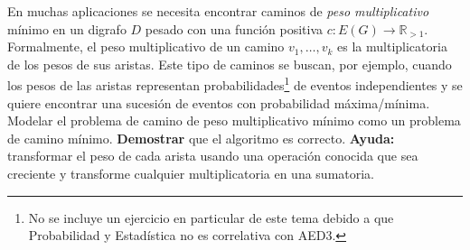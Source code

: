 

  \item En muchas aplicaciones se necesita encontrar caminos de \emph{peso multiplicativo} mínimo en un digrafo $D$ pesado con una función positiva $c \colon E(G) \to \mathbb{R}_{> 1}$.  Formalmente, el peso multiplicativo de un camino $v_1, \ldots, v_k$ es la multiplicatoria de los pesos de sus aristas.  Este tipo de caminos se buscan, por ejemplo, cuando los pesos de las aristas representan probabilidades\footnote{No se incluye un ejercicio en particular de este tema debido a que Probabilidad y Estadística no es correlativa con AED3.} de eventos independientes y se quiere encontrar una sucesión de eventos con probabilidad máxima/mínima.  Modelar el problema de camino de peso multiplicativo mínimo como un problema de camino mínimo.  \textbf{Demostrar} que el algoritmo es correcto.  \textbf{Ayuda:} transformar el peso de cada arista usando una operación conocida que sea creciente y transforme cualquier multiplicatoria en una sumatoria.

